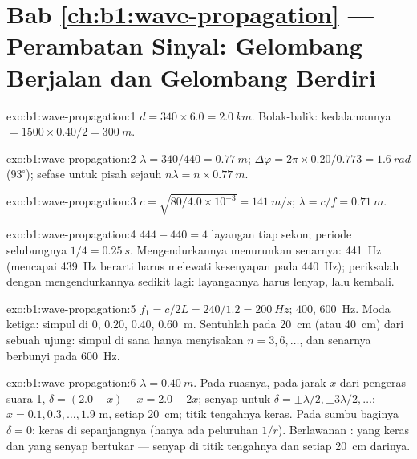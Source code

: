 \section*{Bab \ref{ch:b1:wave-propagation} --- Perambatan Sinyal: Gelombang Berjalan dan Gelombang Berdiri}

\begin{solution}{exo:b1:wave-propagation:1}
$d = 340 \times 6.0 = \qty{2.0}{km}$. Bolak-balik: kedalamannya $= 1500 \times
0.40/2 = \qty{300}{m}$.
\end{solution}

\begin{solution}{exo:b1:wave-propagation:2}
$\lambda = 340/440 = \qty{0.77}{m}$; $\Delta\varphi = 2\pi \times
0.20/0.773 = \qty{1.6}{rad}$ ($93^\circ$); sefase untuk pisah sejauh
$n\lambda = n \times \qty{0.77}{m}$.
\end{solution}

\begin{solution}{exo:b1:wave-propagation:3}
$c = \sqrt{80/4.0\times10^{-3}} = \qty{141}{m/s}$; $\lambda = c/f =
\qty{0.71}{m}$.
\end{solution}

\begin{solution}{exo:b1:wave-propagation:4}
$444 - 440 = 4$ layangan tiap sekon; periode selubungnya $1/4 = \qty{0.25}{s}$.
Mengendurkannya menurunkan senarnya: \qty{441}{Hz} (mencapai \qty{439}{Hz}
berarti harus melewati kesenyapan pada \qty{440}{Hz}); periksalah dengan
mengendurkannya sedikit lagi: layangannya harus lenyap, lalu kembali.
\end{solution}

\begin{solution}{exo:b1:wave-propagation:5}
$f_1 = c/2L = 240/1.2 = \qty{200}{Hz}$; $400$, \qty{600}{Hz}. Moda ketiga:
simpul di $0$, $0.20$, $0.40$, \qty{0.60}{m}. Sentuhlah pada \qty{20}{cm}
(atau \qty{40}{cm}) dari sebuah ujung: simpul di sana hanya menyisakan
$n = 3, 6, \dots$, dan senarnya berbunyi pada \qty{600}{Hz}.
\end{solution}

\begin{solution}{exo:b1:wave-propagation:6}
$\lambda = \qty{0.40}{m}$. Pada ruasnya, pada jarak $x$ dari pengeras
suara 1, $\delta = (2.0 - x) - x = 2.0 - 2x$; senyap untuk $\delta = \pm\lambda/2,
\pm 3\lambda/2, \dots$: $x = 0.1, 0.3, \dots, 1.9$ m, setiap \qty{20}{cm};
titik tengahnya keras. Pada sumbu baginya $\delta = 0$: keras di
sepanjangnya (hanya ada peluruhan $1/r$). Berlawanan : yang keras
dan yang senyap bertukar --- senyap di titik tengahnya dan setiap \qty{20}{cm} darinya.
\end{solution}

